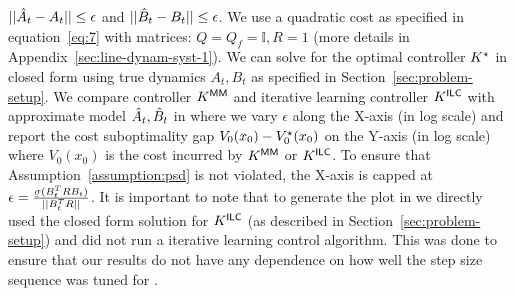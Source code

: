 $||\hat{A}_{t} - A_{t}|| \leq \epsilon$ and $||\hat{B}_{t} - B_{t}|| \leq \epsilon$.
We use a quadratic cost as specified in equation~\ref{eq:7} with matrices:
  $Q = Q_{f} = \mathbb{I}, R = 1$ (more details in Appendix~\ref{sec:line-dynam-syst-1}).
We can solve for the optimal controller $K^\star$ in closed form using true
dynamics $A_{t}, B_{t}$ as specified in Section~\ref{sec:problem-setup}. We compare
\MM{} controller $K^\mathsf{MM}$ 
and iterative learning controller $K^\mathsf{ILC}$ with approximate model
$\hat{A}_{t}, \hat{B}_{t}$ in  where we vary $\epsilon$ along
the X-axis (in log scale) and report the cost suboptimality gap
$V_{0}(x_{0}) - V^\star_{0}(x_{0})$ on the Y-axis
(in log scale) where $V_{0}(x_{0})$ is the cost incurred by $K^\mathsf{MM}$ or $K^\mathsf{ILC}$.
To ensure that
Assumption~\ref{assumption:psd} is not violated, the X-axis is capped at
$\epsilon = \frac{\ubar{\sigma}(B_{t}^{T}RB_{t})}{||B_{t}^{T}R||}$.
It is important to note that to generate the plot in  we
directly used the closed form solution for $K^\mathsf{ILC}$ (as described in
Section~\ref{sec:problem-setup}) and did not run a iterative learning control
algorithm. This was done to ensure that our results do not have any dependence
on how well the step size sequence was tuned for \ILC{}.

